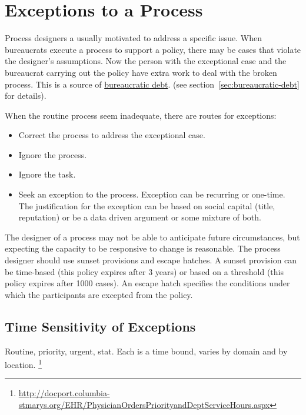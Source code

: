 \section{Exceptions to a Process\label{sec:exceptions-to-process}}


Process designers a usually motivated to address a specific issue. When bureaucrats execute a process to support a policy, there may be cases that violate the designer's assumptions. Now the person with the exceptional case and the bureaucrat carrying out the policy have extra work to deal with the broken process. This is a source of \hyperref[sec:bureaucratic-debt]{bureaucratic debt}. 
\ifsectionref
(see section~\ref{sec:bureaucratic-debt} for details). 
\fi

When the routine process seem inadequate, there are routes for exceptions:
\begin{itemize}
    \item Correct the process to address the exceptional case.
    \item Ignore the process.
    \item Ignore the task.
    \item Seek an exception to the process. Exception can be recurring or one-time. The justification for the exception can be based on social capital (title, reputation) or be a data driven argument or some mixture of both.
\end{itemize}

The designer of a process may not be able to anticipate future circumstances, but expecting the capacity to be responsive to change is reasonable. The process designer should use sunset provisions and escape hatches.  
A sunset provision can be time-based (this policy expires after 3 years) or based on a threshold (this policy expires after 1000 cases). An escape hatch specifies the conditions under which the participants are excepted from the policy. 

\subsection*{Time Sensitivity of Exceptions}
Routine, priority, urgent, stat. 
Each is a time bound, varies by domain and by location.
\footnote{\href{http://docport.columbia-stmarys.org/EHR/PhysicianOrdersPriorityandDeptServiceHours.aspx}{http://docport.columbia-stmarys.org/EHR/PhysicianOrdersPriorityandDeptServiceHours.aspx}}